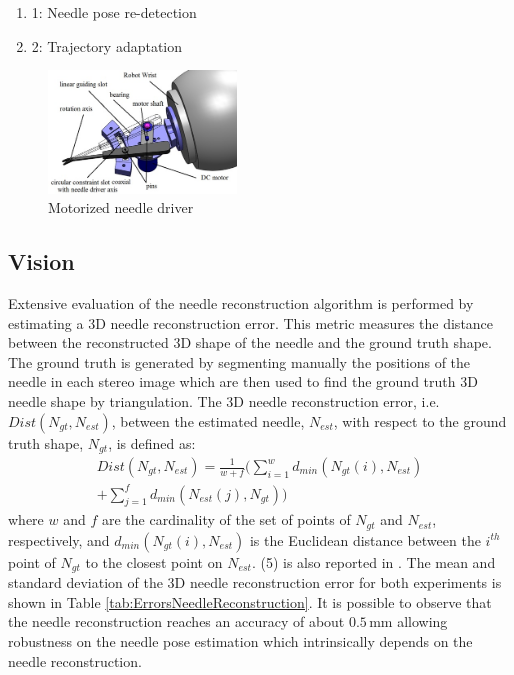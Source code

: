 \begin{enumerate}
\item{1}: Needle pose re-detection
\item{2}: Trajectory adaptation
\end{enumerate}

\begin{figure}
\centering
{
\includegraphics[width=5cm]{./fig/needledriver.jpg}
\caption{\scriptsize{Motorized needle driver}}

\label{fig:overview}
}
\end{figure}

\subsection{Vision}

Extensive evaluation of the needle reconstruction algorithm is performed by estimating a 3D needle reconstruction error. This metric measures the distance between the reconstructed 3D shape of the needle and the ground truth shape. The ground truth is generated by segmenting manually the positions of the needle in each stereo image which are then used to find the ground truth 3D needle shape by triangulation. The 3D needle reconstruction error, i.e. $Dist(N_{gt}, N_{est})$, between the estimated needle, $N_{est}$, with respect to the ground truth shape, $N_{gt}$, is defined as:
\begin{eqnarray}
Dist(N_{gt}, N_{est}) = \frac{1}{w + f} \Biggl( \sum_{i=1}^{w} d_{min}(N_{gt}(i), N_{est}) \nonumber \\ 
+ \sum_{j=1}^{f} d_{min}(N_{est}(j), N_{gt}) \Biggr)
\end{eqnarray}
where $w$ and $f$ are the cardinality of the set of points of $N_{gt}$ and $N_{est}$, respectively, and $d_{min}(N_{gt}(i), N_{est})$ is the Euclidean distance between the $i^{th}$ point of $N_{gt}$ to the closest point on $N_{est}$. (5) is also reported in \cite{van2005guide}. The mean and standard deviation of the 3D needle reconstruction error for both experiments is shown in Table \ref{tab:ErrorsNeedleReconstruction}. It is possible to observe that the needle reconstruction reaches an accuracy of about $0.5\,$mm allowing robustness on the needle pose estimation which intrinsically depends on the needle reconstruction. 

